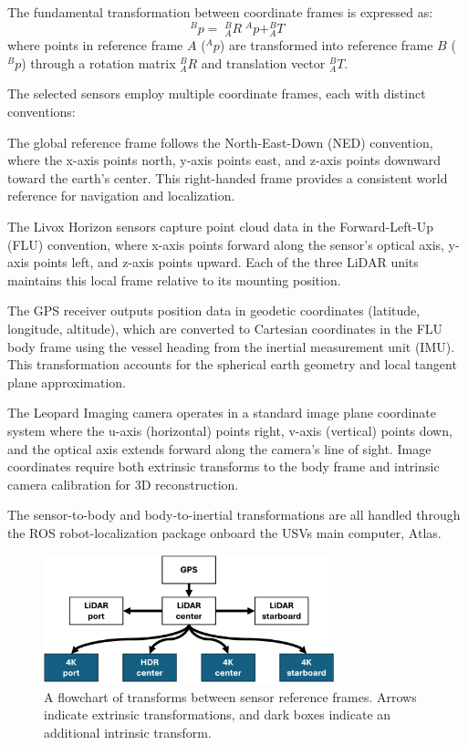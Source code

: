 The fundamental transformation between coordinate frames is expressed as:
\begin{equation}
^Bp =\; ^B_AR \; ^Ap + ^B_A T
\end{equation}
where points in reference frame $A$ ($^Ap$) are transformed into reference frame $B$ ($^Bp$) through a rotation matrix $^B_AR$ and translation vector $^B_A T$.

The selected sensors employ multiple coordinate frames, each with distinct conventions:

The global reference frame follows the North-East-Down (NED) convention, where the x-axis points north, y-axis points east, and z-axis points downward toward the earth's center. This right-handed frame provides a consistent world reference for navigation and localization.

The Livox Horizon sensors capture point cloud data in the Forward-Left-Up (FLU) convention, where x-axis points forward along the sensor's optical axis, y-axis points left, and z-axis points upward. Each of the three LiDAR units maintains this local frame relative to its mounting position.

The GPS receiver outputs position data in geodetic coordinates (latitude, longitude, altitude), which are converted to Cartesian coordinates in the FLU body frame using the vessel heading from the inertial measurement unit (IMU). This transformation accounts for the spherical earth geometry and local tangent plane approximation.

The Leopard Imaging camera operates in a standard image plane coordinate system where the u-axis (horizontal) points right, v-axis (vertical) points down, and the optical axis extends forward along the camera's line of sight. Image coordinates require both extrinsic transforms to the body frame and intrinsic camera calibration for 3D reconstruction.

The sensor-to-body and body-to-inertial transformations are all handled through the \Ac{ROS} robot-localization package onboard the \Acp{USV} main computer, Atlas.
\begin{figure}[htbp]
\centering
\includegraphics[width=0.75\textwidth]{Images/spatial_transforms.png}
\caption{A flowchart of transforms between sensor reference frames. Arrows indicate extrinsic transformations, and dark boxes indicate an additional intrinsic transform.}
\label{transform_diagm}
\end{figure}

